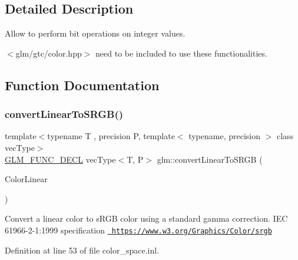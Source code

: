 \subsection{Detailed Description}
Allow to perform bit operations on integer values. 

$<$glm/gtc/color.\+hpp$>$ need to be included to use these functionalities. 

\subsection{Function Documentation}
\mbox{\label{group__gtc__color__space_gad813dcd99644cafc775e83d6504ccb93}} 
\subsubsection{\texorpdfstring{convertLinearToSRGB()}{convertLinearToSRGB()}\hspace{0.1cm}{\footnotesize\ttfamily [1/2]}}
{\footnotesize\ttfamily template$<$typename T , precision P, template$<$ typename, precision $>$ class vec\+Type$>$ \\
\mbox{\hyperlink{setup_8hpp_ab2d052de21a70539923e9bcbf6e83a51}{G\+L\+M\+\_\+\+F\+U\+N\+C\+\_\+\+D\+E\+CL}} vec\+Type$<$T, P$>$ glm\+::convert\+Linear\+To\+S\+R\+GB (\begin{DoxyParamCaption}\item[{vec\+Type$<$ T, P $>$ const \&}]{Color\+Linear }\end{DoxyParamCaption})}

Convert a linear color to s\+R\+GB color using a standard gamma correction. I\+EC 61966-\/2-\/1\+:1999 specification \href{https://www.w3.org/Graphics/Color/srgb}{\texttt{ https\+://www.\+w3.\+org/\+Graphics/\+Color/srgb}} 

Definition at line 53 of file color\+\_\+space.\+inl.

\mbox{\label{group__gtc__color__space_ga63f8b003da7acf44370eb47bfb8b3d42}} 
